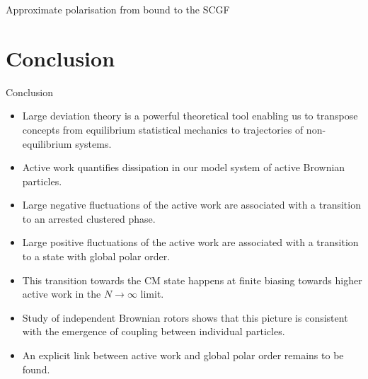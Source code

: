 \documentclass{beamer}
\begin{document}
\begin{frame}{Approximate polarisation from bound to the SCGF}

\end{frame}

\section{Conclusion}

\begin{frame}[t]{Conclusion}

\pause
\begin{itemize}[<+->]
  \item Large deviation theory is a powerful theoretical tool enabling us to transpose concepts from equilibrium statistical mechanics to trajectories of non-equilibrium systems.
  \item Active work quantifies dissipation in our model system of active Brownian particles.
  \item Large negative fluctuations of the active work are associated with a transition to an arrested clustered phase.
  \item Large positive fluctuations of the active work are associated with a transition to a state with global polar order.
  \item This transition towards the CM state happens at finite biasing towards higher active work in the $N \rightarrow \infty$ limit.
  \item Study of independent Brownian rotors shows that this picture is consistent with the emergence of coupling between individual particles.
  \item An explicit link between active work and global polar order remains to be found.
\end{itemize}

\end{frame}
\end{document}
